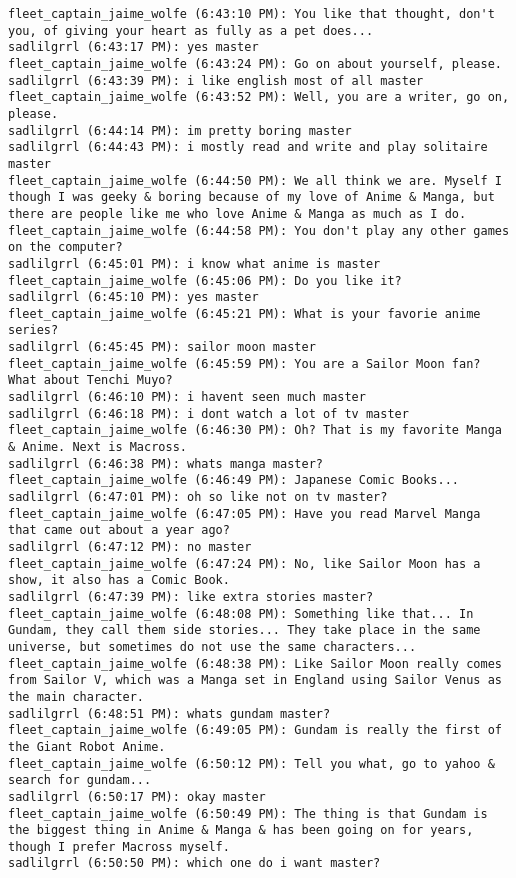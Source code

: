 \begin{verbatim}
fleet_captain_jaime_wolfe (6:43:10 PM): You like that thought, don't you, of giving your heart as fully as a pet does...
sadlilgrrl (6:43:17 PM): yes master
fleet_captain_jaime_wolfe (6:43:24 PM): Go on about yourself, please.
sadlilgrrl (6:43:39 PM): i like english most of all master
fleet_captain_jaime_wolfe (6:43:52 PM): Well, you are a writer, go on, please.
sadlilgrrl (6:44:14 PM): im pretty boring master
sadlilgrrl (6:44:43 PM): i mostly read and write and play solitaire master
fleet_captain_jaime_wolfe (6:44:50 PM): We all think we are. Myself I though I was geeky & boring because of my love of Anime & Manga, but there are people like me who love Anime & Manga as much as I do.
fleet_captain_jaime_wolfe (6:44:58 PM): You don't play any other games on the computer?
sadlilgrrl (6:45:01 PM): i know what anime is master
fleet_captain_jaime_wolfe (6:45:06 PM): Do you like it?
sadlilgrrl (6:45:10 PM): yes master
fleet_captain_jaime_wolfe (6:45:21 PM): What is your favorie anime series?
sadlilgrrl (6:45:45 PM): sailor moon master
fleet_captain_jaime_wolfe (6:45:59 PM): You are a Sailor Moon fan? What about Tenchi Muyo?
sadlilgrrl (6:46:10 PM): i havent seen much master
sadlilgrrl (6:46:18 PM): i dont watch a lot of tv master
fleet_captain_jaime_wolfe (6:46:30 PM): Oh? That is my favorite Manga & Anime. Next is Macross.
sadlilgrrl (6:46:38 PM): whats manga master?
fleet_captain_jaime_wolfe (6:46:49 PM): Japanese Comic Books...
sadlilgrrl (6:47:01 PM): oh so like not on tv master?
fleet_captain_jaime_wolfe (6:47:05 PM): Have you read Marvel Manga that came out about a year ago?
sadlilgrrl (6:47:12 PM): no master
fleet_captain_jaime_wolfe (6:47:24 PM): No, like Sailor Moon has a show, it also has a Comic Book.
sadlilgrrl (6:47:39 PM): like extra stories master?
fleet_captain_jaime_wolfe (6:48:08 PM): Something like that... In Gundam, they call them side stories... They take place in the same universe, but sometimes do not use the same characters...
fleet_captain_jaime_wolfe (6:48:38 PM): Like Sailor Moon really comes from Sailor V, which was a Manga set in England using Sailor Venus as the main character.
sadlilgrrl (6:48:51 PM): whats gundam master?
fleet_captain_jaime_wolfe (6:49:05 PM): Gundam is really the first of the Giant Robot Anime.
fleet_captain_jaime_wolfe (6:50:12 PM): Tell you what, go to yahoo & search for gundam...
sadlilgrrl (6:50:17 PM): okay master
fleet_captain_jaime_wolfe (6:50:49 PM): The thing is that Gundam is the biggest thing in Anime & Manga & has been going on for years, though I prefer Macross myself.
sadlilgrrl (6:50:50 PM): which one do i want master?

\end{verbatim}
